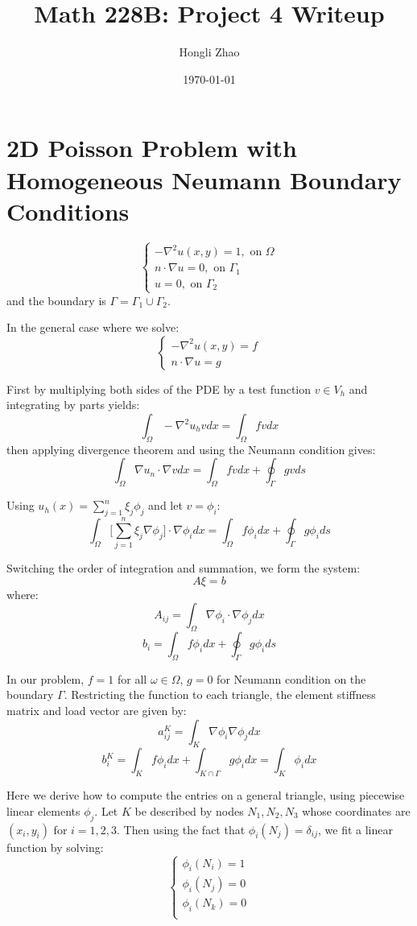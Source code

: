\documentclass[12pt]{article} %
\author{Hongli Zhao}
\title{Math 228B: Project 4 Writeup}
\date{\today}
\begin{document}
\maketitle
\section{2D Poisson Problem with Homogeneous Neumann Boundary Conditions}
$$
	\begin{cases}
		-\nabla^2 u(x,y) = 1, \text{ on $\Omega$}\\
		n \cdot \nabla u = 0, \text{ on $\Gamma_1$}\\
		u = 0, \text{ on $\Gamma_2$}
	\end{cases}
$$ and the boundary is $\Gamma = \Gamma_1 \cup \Gamma_2$.

In the general case where we solve:
$$
	\begin{cases}
		-\nabla^2 u(x,y) = f \\
		n \cdot \nabla u = g
	\end{cases}
$$

First by multiplying both sides of the PDE by a test function $v\in V_h$ and integrating by parts yields:
$$
	\int_{\Omega}-\nabla^2 u_h vdx = \int_{\Omega}fv dx
$$ then applying divergence theorem and using the Neumann condition gives:
$$
	\int_{\Omega}\nabla u_n \cdot \nabla v dx = \int_{\Omega}fv dx + \oint_{\Gamma}gv ds
$$

Using $u_h(x) = \sum_{j=1}^{n}\xi_j\phi_j$ and let $v = \phi_i$:
$$
	\int_{\Omega}\bigg[ \sum_{j=1}^{n}\xi_j\nabla\phi_{j}\bigg]\cdot\nabla\phi_idx = \int_{\Omega}f\phi_idx +\oint_{\Gamma}g\phi_{i}ds
$$

Switching the order of integration and summation, we form the system:
$$
	A\xi = b
$$ where:
$$
	A_{ij} = \int_{\Omega}\nabla\phi_{i}\cdot\nabla\phi_{j}dx
$$
$$
	b_i = \int_{\Omega}f\phi_{i}dx + \oint_{\Gamma}g\phi_ids
$$

In our problem, $f = 1$ for all $\omega\in\Omega$, $g = 0$ for Neumann condition on the boundary $\Gamma$. Restricting the function to each triangle, the element stiffness matrix and load vector are given by:
$$
	a_{ij}^{K} = \int_{K}\nabla \phi_{i}\nabla\phi_{j}dx
$$
$$
	b_{i}^{K} = \int_{K}f\phi_{i}dx + \int_{K\cap\Gamma}g\phi_{i}dx = \int_{K}\phi_idx
$$

Here we derive how to compute the entries on a general triangle, using piecewise linear elements $\phi_j$. Let $K$ be described by nodes $N_1,N_2,N_3$ whose coordinates are $(x_i,y_i)$ for $i=1,2,3$. Then using the fact that $\phi_{i}(N_j)=\delta_{ij}$, we fit a linear function by solving:
$$
	\begin{cases}
		\phi_{i}(N_i) = 1 \\
		\phi_{i}(N_j) = 0 \\
		\phi_{i}(N_k) = 0 \\
	\end{cases}
$$
\end{document}
